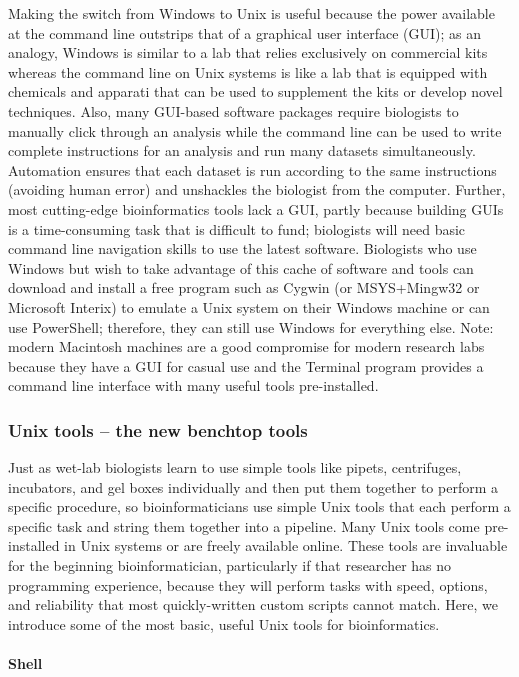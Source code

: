 \documentclass[ChapterTOCs,krantz2]{krantz} %
\begin{document}
Making the switch from Windows to Unix
is useful because the power available at the command line outstrips that
of a graphical user interface (GUI); as an analogy, Windows is similar to a lab
that relies exclusively on commercial kits whereas the command line on Unix
systems is like a lab that is equipped with chemicals and apparati that can be used 
to supplement the kits or develop novel techniques.  Also, many
GUI-based software packages require biologists to manually click through an analysis
while the command line can be used to write complete instructions for an
analysis and run many datasets simultaneously.   Automation ensures 
that each dataset is run according to the
same instructions (avoiding human error) and unshackles the biologist from
the computer.  Further, most
cutting-edge bioinformatics tools lack a GUI,
partly because building GUIs is a time-consuming task that is
difficult to fund; biologists will need
basic command line navigation skills to use the latest software.  Biologists
who use Windows but wish to take advantage of this cache of software and tools
can download and install a free program such as Cygwin (or MSYS+Mingw32 or 
Microsoft Interix) to emulate a Unix system
on their Windows machine or can use PowerShell; 
therefore, they can still use Windows for everything
else. Note: modern Macintosh machines are a
good compromise for modern research labs because they have a GUI for casual use
and the Terminal program provides a command line interface with many useful
tools pre-installed.

\subsubsection{Unix tools -- the new benchtop tools}

Just as wet-lab biologists learn to use simple tools like pipets, centrifuges,
incubators, and gel boxes individually and then put them together to perform a
specific procedure, so bioinformaticians use simple Unix tools
that each perform a specific task and string them together into a pipeline.
Many Unix tools come pre-installed in Unix systems or are freely
available online. These tools are invaluable for the beginning
bioinformatician, particularly if that researcher has no programming experience, 
because they will perform tasks with speed, options, and
reliability that most quickly-written custom scripts cannot match.  Here, we
introduce some of the most basic, useful Unix tools for bioinformatics.

\paragraph{Shell}
\end{document}

